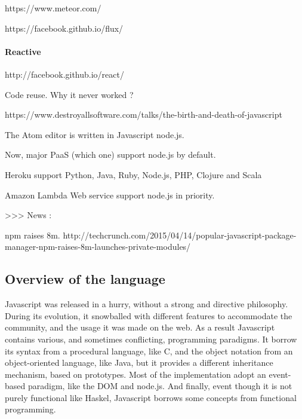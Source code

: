https://www.meteor.com/

https://facebook.github.io/flux/

\paragraph{Reactive}

http://facebook.github.io/react/

Code reuse.
Why it never worked ?





https://www.destroyallsoftware.com/talks/the-birth-and-death-of-javascript

The Atom editor is written in Javascript node.js.



Now, major PaaS (which one) support node.js by default.

Heroku support Python, Java, Ruby, Node.js, PHP, Clojure and Scala

Amazon Lambda Web service support node.js in priority.


>>> News :

npm raises 8m.
http://techcrunch.com/2015/04/14/popular-javascript-package-manager-npm-raises-8m-launches-private-modules/




\subsection{Overview of the language}

Javascript was released in a hurry, without a strong and directive philosophy.
During its evolution, it snowballed with different features to accommodate the community, and the usage it was made on the web. As a result Javascript contains various, and sometimes conflicting, programming paradigms.
It borrow its syntax from a procedural language, like C, and the object notation from an object-oriented language, like Java, but it provides a different inheritance mechanism, based on prototypes. Most of the implementation adopt an event-based paradigm, like the DOM and node.js.
And finally, event though it is not purely functional like Haskel, Javascript borrows some concepts from functional programming.

